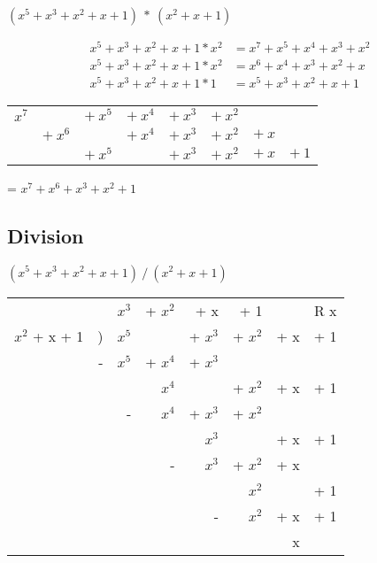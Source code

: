 \documentclass[letterpaper]{article}
\begin{document}
\((x^5 + x^3 + x^2 + x + 1)\ *\ (x^2 + x + 1)\)

\begin{equation*}
  \begin{split}
    x^5 + x^3 + x^2 + x + 1 * x^2 &= x^7 + x^5 + x^4 + x^3 + x^2 \\
    x^5 + x^3 + x^2 + x + 1 * x^2 &= x^6 + x^4 + x^3 + x^2 + x \\
    x^5 + x^3 + x^2 + x + 1 * 1 &= x^5 + x^3 + x^2 + x + 1
  \end{split}
\end{equation*}

\begin{tabular}{ c c c c c c c c }
\(x^7\) &   & \(+\ x^5\) & \(+\ x^4\) & \(+\ x^3\) &\(+\ x^2\)&   &   \\
  & \(+\ x^6\) &   & \(+\ x^4\) & \(+\ x^3\) & \(+\ x^2\) &\(+\ x\) &   \\
  &   & \(+\ x^5\) &   & \(+\ x^3\) & \(+\ x^2\) & \(+\ x\) & \(+\ 1\) \\
\end{tabular}

= \(x^7 + x^6 + x^3 + x^2 + 1\)

\subsection{Division}

\((x^5 + x^3 + x^2 + x + 1)\ /\ (x^2 + x + 1)\)

\bigskip

\begin{tabular}{rrrrrrrr}
                &   & \(x^3\) & + \(x^2\) & + x       & + 1       &     & R x \\ \hhline{~-------}
\(x^2\) + x + 1 & ) & \(x^5\) &           & + \(x^3\) & + \(x^2\) & + x & + 1 \\
                & - & \(x^5\) & + \(x^4\) & + \(x^3\) &           &     &     \\ \hhline{~~------}
                &   &         &   \(x^4\) &           & + \(x^2\) & + x & + 1 \\
                &   &       - &   \(x^4\) & + \(x^3\) & + \(x^2\) &     &     \\ \hhline{~~~-----}
                &   &         &           & \(x^3\)   &           & + x & + 1 \\
                &   &         &         - & \(x^3\)   & + \(x^2\) & + x &     \\ \hhline{~~~~----}
                &   &         &           &           & \(x^2\)   &     & + 1 \\
                &   &         &           &         - & \(x^2\)   & + x & + 1 \\ \hhline{~~~~~---}
                &   &         &           &           &           &   x &    
\end{tabular}
\end{document}
